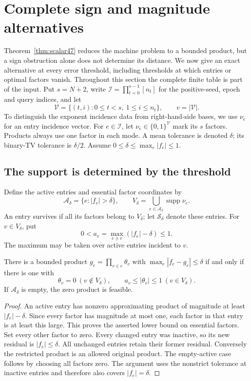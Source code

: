 \section{Complete sign and magnitude alternatives}\label{sec:duality49}
Theorem~\ref{thm:scalar47} reduces the machine problem to a bounded
product, but a sign obstruction alone does not determine its distance.
We now give an exact alternative at every error threshold, including
thresholds at which entries or optimal factors vanish. Throughout this
section the complete finite table is part of the input. Put $s=N+2$,
write $\mathcal I=\prod_{t=0}^{s-1}[n_t]$ for the positive-seed, epoch
and query indices, and let
\[
 \mathcal V=\{(t,i):0\le t<s,\ 1\le i\le n_t\},\qquad
 v=|\mathcal V|.
\]
To distinguish the exponent incidence data from right-hand-side bases, we use $\nu_e$ for an entry incidence vector. For $e\in\mathcal I$, let $\nu_e\in\{0,1\}^{\mathcal V}$ mark its
$s$ factors. Products always use one factor in each mode.
A mean tolerance is denoted $\delta$; its binary-TV tolerance is
$\delta/2$. Assume $0\le\delta\le\max_e|f_e|\le1$.

\subsection{The support is determined by the threshold}
Define the active entries and essential factor coordinates by
\begin{equation}\label{eq:active49}
 \mathcal A_\delta=\{e:|f_e|>\delta\},\qquad
 V_\delta=\bigcup_{e\in\mathcal A_\delta}\operatorname{supp}\nu_e.
\end{equation}
An entry survives if all its factors belong to $V_\delta$; let
$\mathcal S_\delta$ denote these entries. For $v\in V_\delta$, put
\[
 0<a_v=\max_{e\ni v}(|f_e|-\delta)\le1.
\]
The maximum may be taken over active entries incident to $v$.

\begin{lemma}\label{lem:support49}
There is a bounded product $g_e=\prod_{v\in e}\theta_v$ with
$\max_e|f_e-g_e|\le\delta$ if and only if there is one with
\[
 \theta_v=0\ (v\notin V_\delta),\qquad
 a_v\le|\theta_v|\le1\ (v\in V_\delta).
\]
If $\mathcal A_\delta$ is empty, the zero product is feasible.
\end{lemma}
\begin{proof}
An active entry has nonzero approximating product of magnitude at least
$|f_e|-\delta$. Since every factor has magnitude at most one, each
factor in that entry is at least this large. This proves the asserted
lower bound on essential factors. Set every other factor to zero.
Every changed entry was inactive, so its new residual is $|f_e|\le\delta$.
All unchanged entries retain their former residual. Conversely the
restricted product is an allowed original product. The empty-active
case follows by choosing all factors zero. The argument uses the
nonstrict tolerance at inactive entries and therefore also covers
$|f_e|=\delta$.
\end{proof}

